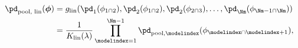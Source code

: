 \begin{equation}
\begin{aligned}
  \pd_{\text{pool, lin}} (\boldsymbol{\phi}) &=
  g_{\text{lin}}(\pd_{1}(\phi_{1 \cap 2}), \pd_{2}(\phi_{1 \cap 2}), \pd_{2}(\phi_{2 \cap 3}), \ldots, \pd_{\Nm}(\phi_{\Nm - 1 \cap \Nm}) )  \\
  &=
  \frac{1}{K_{\text{lin}}(\lambda)}
  \prod_{\modelindex = 1}^{\Nm - 1}
  \pd_{\text{pool}, \modelindex}(\phi_{\modelindex \cap \modelindex + 1}),
  \label{eqn:silly-linear-overall}
\end{aligned}
\end{equation}